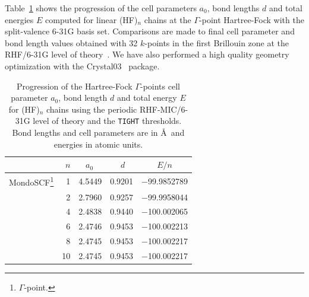 \documentclass[prl,preprint,doublespace]{revtex4} %
\begin{document}
Table~\ref{Tab:HF-n} shows the progression of the cell parameters $a_0$, bond lengths $d$ and
total energies $E$ computed for linear (HF)$_n$ chains at 
the $\Gamma$-point Hartree-Fock with the split-valence 6-31G basis set. 
Comparisons are made to final cell parameter and bond length values obtained 
with 32 $k$-points in the first Brillouin zone at the 
RHF/6-31G level of theory~\cite{DJacquemin99B}. We have also performed a high quality
geometry optimization with the {\sc Crystal03}~\cite{Crystal03} package.


\begin{table}[t]
  \centering
  \caption{\protect
    Progression of the Hartree-Fock $\Gamma$-points cell 
    parameter $a_0$, bond length $d$ and total energy $E$ for (HF)$_n$ chains
    using the periodic RHF-MIC/6-31G level of theory and the {\tt TIGHT} thresholds.
    Bond lengths and cell parameters are in \AA~and energies in atomic units.
  }\label{Tab:HF-n}
  \begin{tabular}{lrllc}
    \toprule
    & $n$ & $\;\;\;a_0$ & $\quad\; d$ & $E/n$ \\
    \hline
    {\sc MondoSCF}\footnote[1]{$\Gamma$-point.}
    &                1  & 4.5449 & 0.9201 & $-$99.9852789 \\
    &                2  & 2.7960 & 0.9257 & $-$99.9958044 \\
    &                4  & 2.4838 & 0.9440 & $-$100.002065 \\
    &                6  & 2.4746 & 0.9453 & $-$100.002213 \\
    &                8  & 2.4745 & 0.9453 & $-$100.002217 \\
    &               10  & 2.4745 & 0.9453 & $-$100.002217 \\

\end{tabular}
\end{table}
\end{document}
